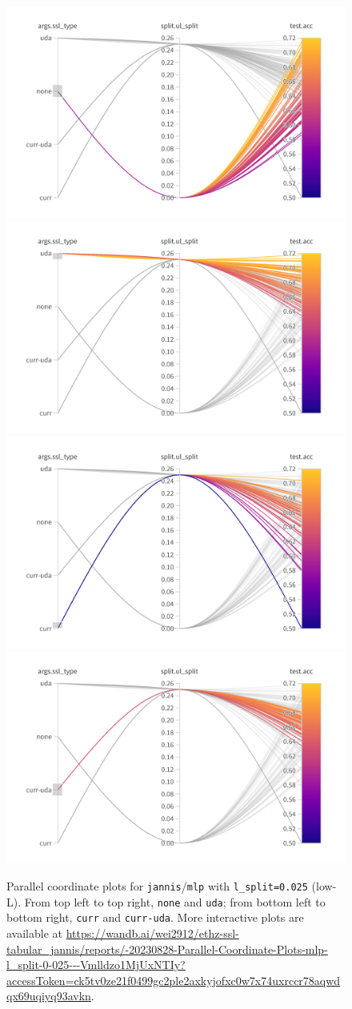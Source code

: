 \documentclass{article}
\begin{document}
\begin{figure}[htbp]
  \centering
  \includegraphics[width=0.48\columnwidth]{par_coords_jannis_mlp_icr_l_split_low_none.png}
  \includegraphics[width=0.48\columnwidth]{par_coords_jannis_mlp_icr_l_split_low_uda.png}
  \includegraphics[width=0.48\columnwidth]{par_coords_jannis_mlp_icr_l_split_low_curr.png}
  \includegraphics[width=0.48\columnwidth]{par_coords_jannis_mlp_icr_l_split_low_curr-uda.png}
  \caption{
    Parallel coordinate plots for \texttt{jannis}/\texttt{mlp} with
    \texttt{l\_split=0.025} (low-L).
    From top left to top right, \texttt{none} and \texttt{uda}; from bottom left to
    bottom right, \texttt{curr} and \texttt{curr-uda}.
    More interactive plots are available at
    {\small\url{https://wandb.ai/wei2912/ethz-ssl-tabular_jannis/reports/-20230828-Parallel-Coordinate-Plots-mlp-l_split-0-025---Vmlldzo1MjUxNTIy?accessToken=ck5tv0ze21f0499gc2ple2axkyjofxc0w7x74uxrccr78aqwdqx69uqiyq93avkn}}.
  }
  \label{fig:par_coords_jannis_mlp_icr_l_split_low}
\end{figure}
\end{document}
